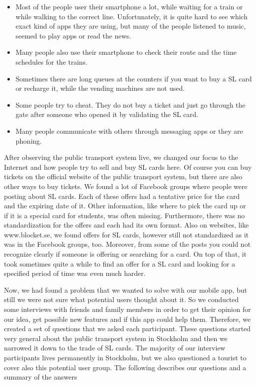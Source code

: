 \documentclass[11pt,twoside,a4paper]{report}
\begin{document}
\begin{itemize}
	\item Most of the people user their smartphone a lot, while waiting for a train or while walking to the correct line. Unfortunately, it is quite hard to see which exact kind of apps they are using, but many of the people listened to music, seemed to play apps or read the news.
	\item Many people also use their smartphone to check their route and the time schedules for the trains.
	\item Sometimes there are long queues at the counters if you want to buy a SL card or recharge it, while the vending machines are not used.
	\item Some people try to cheat. They do not buy a ticket and just go through the gate after someone who opened it by validating the SL card.
	\item Many people communicate with others through messaging apps or they are phoning.
\end{itemize}

After observing the public transport system live, we changed our focus to the Internet and how people try to sell and buy SL cards here. Of course you can buy tickets on the official website of the public transport system, but there are also other ways to buy tickets. We found a lot of Facebook groups where people were posting about SL cards. Each of these offers had a tentative price for the card and the expiring date of it. Other information, like where to pick the card up or if it is a special card for students, was often missing. Furthermore, there was no standardization for the offers and each had its own format. Also on websites, like www.blocket.se, we found offers for SL cards, however still not standardized as it was in the Facebook groups, too. Moreover, from some of the posts you could not recognize clearly if someone is offering or searching for a card. On top of that, it took sometimes quite a while to find an offer for a SL card and looking for a specified period of time was even much harder.

Now, we had found a problem that we wanted to solve with our mobile app, but still we were not sure what potential users thought about it. So we conducted some interviews with friends and family members in order to get their opinion for our idea, get possible new features and if this app could help them. Therefore, we created a set of questions that we asked each participant. These questions started very general about the public transport system in Stockholm and then we narrowed it down to the trade of SL cards. The majority of our interview participants lives permanently in Stockholm, but we also questioned a tourist to cover also this potential user group. The following describes our questions and a summary of the answers
\end{document}

